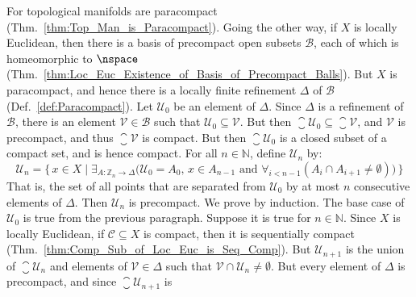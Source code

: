 \documentclass{article}                                                        %
\begin{document}
            \begin{solution}
                For topological manifolds are paracompact
                (Thm.~\ref{thm:Top_Man_is_Paracompact}). Going the other way, if $X$
                is locally Euclidean, then there is a basis of precompact open
                subsets $\mathcal{B}$, each of which is homeomorphic to $\nspace$
                (Thm.~\ref{thm:Loc_Euc_Existence_of_Basis_of_Precompact_Balls}). But
                $X$ is paracompact, and hence there is a locally finite refinement
                $\Delta$ of $\mathcal{B}$ (Def.~\ref{def:Paracompact}). Let
                $\mathcal{U}_{0}$ be an element of $\Delta$. Since $\Delta$ is a
                refinement of $\mathcal{B}$, there is an element
                $\mathcal{V}\in\mathcal{B}$ such that
                $\mathcal{U}_{0}\subseteq\mathcal{V}$. But then
                $\closure{\mathcal{U}_{0}}\subseteq\closure{\mathcal{V}}$, and
                $\mathcal{V}$ is precompact, and thus $\closure{\mathcal{V}}$
                is compact. But then $\closure{\mathcal{U}_{0}}$ is a closed subset
                of a compact set, and is hence compact. For all $n\in\mathbb{N}$,
                define $\mathcal{U}_{n}$ by:
                \begin{equation}
                    \mathcal{U}_{n}=\Big\{\,x\in{X}\;|\;
                        \exists_{A:\mathbb{Z}_{n}\rightarrow\Delta}\big(
                            \mathcal{U}_{0}=A_{0},\,x\in{A}_{n-1}\textrm{ and }
                            \forall_{i<n-1}(A_{i}\cap{A}_{i+1}\ne\emptyset)
                        \big)\,\Big\}
                \end{equation}
                That is, the set of all points that are separated from
                $\mathcal{U}_{0}$ by at most $n$ consecutive elements of $\Delta$.
                Then $\mathcal{U}_{n}$ is precompact. We prove by induction. The
                base case of $\mathcal{U}_{0}$ is true from the previous paragraph.
                Suppose it is true for $n\in\mathbb{N}$. Since $X$ is locally
                Euclidean, if $\mathcal{C}\subseteq{X}$ is compact, then it is
                sequentially compact
                (Thm.~\ref{thm:Comp_Sub_of_Loc_Euc_is_Seq_Comp}). But
                $\mathcal{U}_{n+1}$ is the union of $\closure{\mathcal{U}_{n}}$
                and elements of $\mathcal{V}\in\Delta$ such that
                $\mathcal{V}\cap\mathcal{U}_{n}\ne\emptyset$. But every element of
                $\Delta$ is precompact, and since $\closure{\mathcal{U}_{n+1}}$ is

\end{solution}
\end{document}
